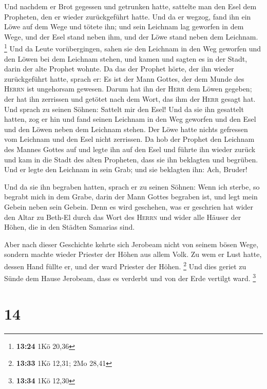  Und nachdem er Brot gegessen und getrunken hatte,
sattelte man den Esel dem Propheten, den er wieder zurückgeführt hatte.
 Und da er wegzog, fand ihn ein Löwe auf dem Wege und
tötete ihn; und sein Leichnam lag geworfen in dem Wege, und der Esel
stand neben ihm, und der Löwe stand neben dem Leichnam. \footnote{\textbf{13:24}
  1Kö 20,36}  Und da Leute vorübergingen, sahen sie den
Leichnam in den Weg geworfen und den Löwen bei dem Leichnam stehen, und
kamen und sagten es in der Stadt, darin der alte Prophet wohnte.
 Da das der Prophet hörte, der ihn wieder zurückgeführt
hatte, sprach er: Es ist der Mann Gottes, der dem Munde des
\textsc{Herrn} ist ungehorsam gewesen. Darum hat ihn der \textsc{Herr}
dem Löwen gegeben; der hat ihn zerrissen und getötet nach dem Wort, das
ihm der \textsc{Herr} gesagt hat.  Und sprach zu seinen
Söhnen: Sattelt mir den Esel! Und da sie ihn gesattelt hatten,
 zog er hin und fand seinen Leichnam in den Weg geworfen
und den Esel und den Löwen neben dem Leichnam stehen. Der Löwe hatte
nichts gefressen vom Leichnam und den Esel nicht zerrissen.
 Da hob der Prophet den Leichnam des Mannes Gottes auf
und legte ihn auf den Esel und führte ihn wieder zurück und kam in die
Stadt des alten Propheten, dass sie ihn beklagten und begrüben.
 Und er legte den Leichnam in sein Grab; und sie
beklagten ihn: Ach, Bruder!

 Und da sie ihn begraben hatten, sprach er zu seinen
Söhnen: Wenn ich sterbe, so begrabt mich in dem Grabe, darin der Mann
Gottes begraben ist, und legt mein Gebein neben sein Gebein.
 Denn es wird geschehen, was er geschrien hat wider den
Altar zu Beth-El durch das Wort des \textsc{Herrn} und wider alle Häuser
der Höhen, die in den Städten Samarias sind.

 Aber nach dieser Geschichte kehrte sich Jerobeam nicht
von seinem bösen Wege, sondern machte wieder Priester der Höhen aus
allem Volk. Zu wem er Lust hatte, dessen Hand füllte er, und der ward
Priester der Höhen. \footnote{\textbf{13:33} 1Kö 12,31; 2Mo 28,41}
 Und dies geriet zu Sünde dem Hause Jerobeam, dass es
verderbt und von der Erde vertilgt ward. \footnote{\textbf{13:34} 1Kö
  12,30}

\hypertarget{section-3}{%
\section{14}\label{section-3}}

